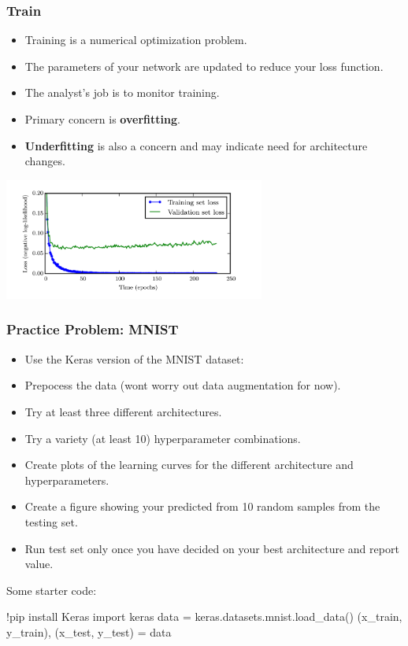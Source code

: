 \documentclass{beamer}
\begin{document}
\begin{frame}
    \frametitle{Train}

    \begin{itemize}
        \item Training is a numerical optimization problem.
        \item The parameters of your network are updated to reduce your loss function.
        \item The analyst’s job is to monitor training.
        \item Primary concern is \textbf{overfitting}.
        \item \textbf{Underfitting} is also a concern and may indicate need for architecture changes.
    \end{itemize}

    \begin{center}
        \includegraphics[height=4cm]{figs/train_val_example.png}
    \end{center}
    
\end{frame}

\begin{frame}[fragile]
    \frametitle{Practice Problem: MNIST}

    \begin{itemize}
        \item Use the Keras version of the MNIST dataset:
        \item Prepocess the data (wont worry out data augmentation for now).
        \item Try at least three different architectures.
        \item Try a variety (at least 10) hyperparameter combinations.
        \item Create plots of the learning curves for the different architecture and hyperparameters.
        \item Create a figure showing your predicted from 10 random samples from the testing set.
        \item Run test set only once you have decided on your best architecture and report value.
    \end{itemize}
    \vskip20pt
    Some starter code:
    \begin{semiverbatim}
!pip install Keras
import keras          
data = keras.datasets.mnist.load_data()
(x_train, y_train), (x_test, y_test) = data
    \end{semiverbatim}    

\end{frame}
\end{document}
